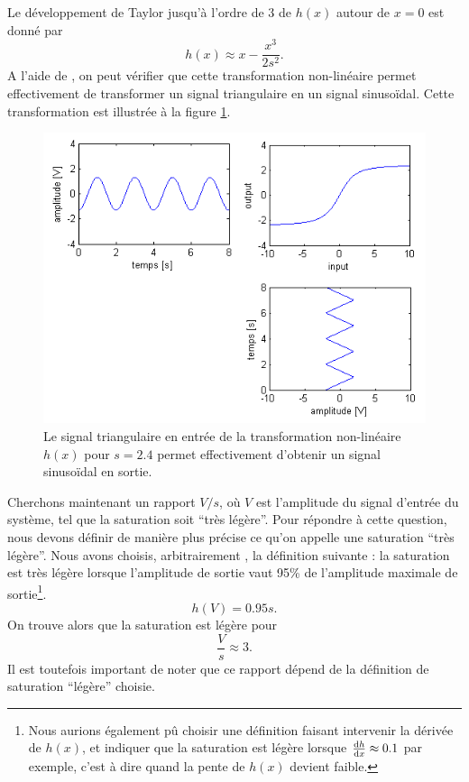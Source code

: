 Le développement de Taylor jusqu'à l'ordre de 3 de
$h(x)$ autour de $x=0$ est donné par 
\[ h(x) \approx x-\frac{x^3}{2s^2}. \]
A l'aide de \matlab, on peut vérifier que cette
transformation non-linéaire permet effectivement
de transformer un signal triangulaire en un signal
sinusoïdal. Cette transformation est illustrée à
la figure \ref{fig:in_out_diagram}.

\begin{figure}[ht]
	\centering
	\includegraphics[scale=0.6]{img/in_out_diagram.png}
	\caption{Le signal triangulaire en entrée de la transformation
	non-linéaire $h(x)$ pour $s=2.4$ permet effectivement d'obtenir
	un signal sinusoïdal en sortie.}
	\label{fig:in_out_diagram}
\end{figure}

Cherchons maintenant un rapport $V/s$, où $V$ est
l'amplitude du signal d'entrée du système, tel que
la saturation soit ``très légère''. Pour répondre à cette question,
nous devons définir de manière plus précise ce qu'on appelle
une saturation ``très légère''. Nous avons choisis, arbitrairement
, la définition suivante : la saturation est très légère
lorsque l'amplitude de sortie vaut 95\% de l'amplitude
maximale de sortie\footnote{Nous aurions également pû choisir une définition
faisant intervenir la dérivée de $h(x)$, et indiquer que la
saturation est légère lorsque $\frac{\operatorname{d}\! h}{\operatorname{d}\! x} \approx 0.1$ par exemple,
c'est à dire quand la pente de $h(x)$ devient faible.}.
\[ h(V) = 0.95s. \]
On trouve alors que la saturation est légère pour 
\[ \frac{V}{s} \approx 3. \]
Il est toutefois important de noter que ce rapport
dépend de la définition de saturation ``légère'' choisie.
